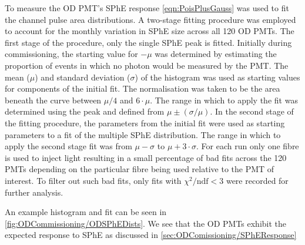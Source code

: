 To measure the OD PMT's SPhE response \autoref{eqn:PoisPlusGauss} was used to fit the channel pulse area distributions. A two-stage fitting procedure was employed to account for the monthly variation in SPhE size across all 120 OD PMTs. The first stage of the procedure, only the single SPhE peak is fitted. Initially during commissioning, the starting value for $-\mu$ was determined by estimating the proportion of events in which no photon would be measured by the PMT. The mean ($\mu$) and standard deviation ($\sigma$) of the histogram was used as starting values for components of the initial fit. The normalisation was taken to be the area beneath the curve between $\mu/4$ and $6\cdot\mu$. The range in which to apply the fit was determined using the peak and defined from $\mu\pm(\sigma/\mu)$. In the second stage of the fitting procedure, the parameters from the initial fit were used as starting parameters to a fit of the multiple SPhE distribution. The range in which to apply the second stage fit was from $\mu-\sigma$ to $\mu+3\cdot\sigma$. For each run only one fibre is used to inject light resulting in a small percentage of bad fits across the 120 PMTs depending on the particular fibre being used relative to the PMT of interest. To filter out such bad fits, only fits with $\chi^2/\text{ndf}<3$ were recorded for further analysis.

An example histogram and fit can be seen in \autoref{fig:ODCommissioning/ODSPhEDists}. We see that the OD PMTs exhibit the expected response to SPhE as discussed in \autoref{sec:ODComissioning/SPhEResponse}

